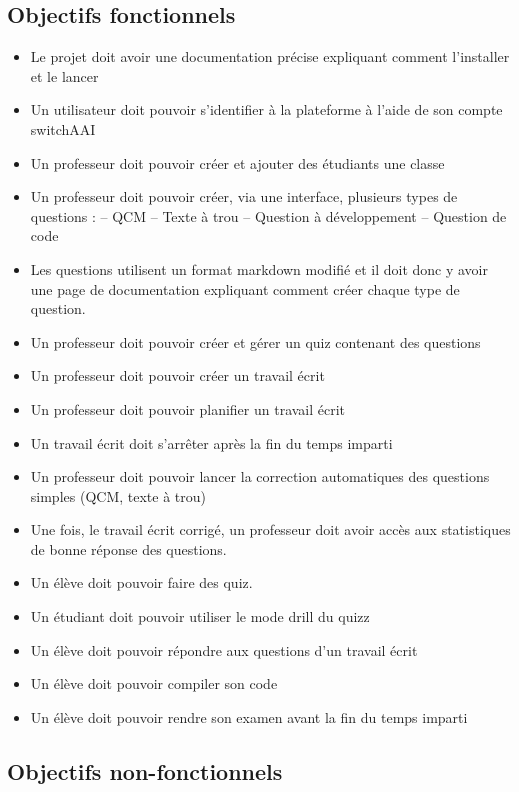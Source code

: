 \subsection*{Objectifs fonctionnels}
\begin{itemize}
    \item Le projet doit avoir une documentation précise expliquant comment l'installer et le lancer
    \item Un utilisateur doit pouvoir s'identifier à la plateforme à l'aide de son compte switchAAI
    \item Un professeur doit pouvoir créer et ajouter des étudiants une classe
    \item Un professeur doit pouvoir créer, via une interface, plusieurs types de questions :
          \subitem – QCM
          \subitem – Texte à trou
          \subitem – Question à développement
          \subitem – Question de code
    \item Les questions utilisent un format markdown modifié et il doit donc y avoir une page de documentation expliquant comment créer chaque type de question.
    \item Un professeur doit pouvoir créer et gérer un quiz contenant des questions
    \item Un professeur doit pouvoir créer un travail écrit
    \item Un professeur doit pouvoir planifier un travail écrit
    \item Un travail écrit doit s'arrêter après la fin du temps imparti
    \item Un professeur doit pouvoir lancer la correction automatiques des questions simples (QCM, texte à trou)
    \item Une fois, le travail écrit corrigé, un professeur doit avoir accès aux statistiques de bonne réponse des questions.
    \item Un élève doit pouvoir faire des quiz.
    \item Un étudiant doit pouvoir utiliser le mode drill du quizz
    \item Un élève doit pouvoir répondre aux questions d'un travail écrit
    \item Un élève doit pouvoir compiler son code
    \item Un élève doit pouvoir rendre son examen avant la fin du temps imparti
\end{itemize}

\subsection*{Objectifs non-fonctionnels}

